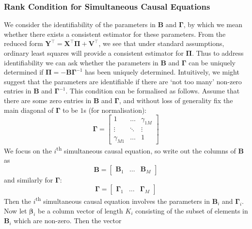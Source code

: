 \documentclass[11pt]{report} %
\begin{document}
\subsubsection{Rank Condition for Simultaneous Causal Equations \cite{Amemiya1985}}

We consider the identifiability of the parameters in $\mathbf{B}$ and $\boldsymbol{\Gamma}$, by which we mean whether there exists a consistent estimator for these parameters. From the reduced form $\mathbf{Y}^{\top} = \mathbf{X}^{\top}\boldsymbol{\Pi} + \mathbf{V}^{\top}$, we see that under standard assumptions, ordinary least squares will provide a consistent estimator for $\boldsymbol{\Pi}$. Thus to address identifiability we can ask whether the parameters in $\mathbf{B}$ and $\boldsymbol{\Gamma}$ can be uniquely determined if $\boldsymbol{\Pi} = -\mathbf{B}\boldsymbol{\Gamma}^{-1}$ has been uniquely determined. Intuitively, we might suggest that the parameters are identifiable if there are `not too many' non-zero entries in $\mathbf{B}$ and $\boldsymbol{\Gamma}^{-1}$. This condition can be formalised as follows. Assume that there are some zero entries in $\mathbf{B}$ and $\boldsymbol{\Gamma}$, and without loss of generality fix the main diagonal of $\boldsymbol{\Gamma}$ to be $1$s (for normalisation):
\begin{equation}
\boldsymbol{\Gamma} = \begin{bmatrix}
1 & \dots & \gamma_{1M} \\
\vdots & \ddots & \vdots \\
\gamma_{M1} & \dots & 1
\end{bmatrix}
\end{equation}
We focus on the $i$\textsuperscript{th} simultaneous causal equation, so write out the columns of $\mathbf{B}$ as
\begin{equation}
\mathbf{B} = \begin{bmatrix} \mathbf{B}_{1} & \dots & \mathbf{B}_{M} \end{bmatrix}
\end{equation}
and similarly for $\boldsymbol{\Gamma}$:
\begin{equation}
\boldsymbol{\Gamma} = \begin{bmatrix} \boldsymbol{\Gamma}_{1} & \dots & \boldsymbol{\Gamma}_{M} \end{bmatrix}
\end{equation}
Then the $i$\textsuperscript{th} simultaneous causal equation involves the parameters in $\mathbf{B}_{i}$ and $\boldsymbol{\Gamma}_{i}$. Now let $\boldsymbol{\beta}_{i}$ be a column vector of length $K_{i}$ consisting of the subset of elements in $\mathbf{B}_{i}$ which are non-zero. Then the vector
\end{document}
